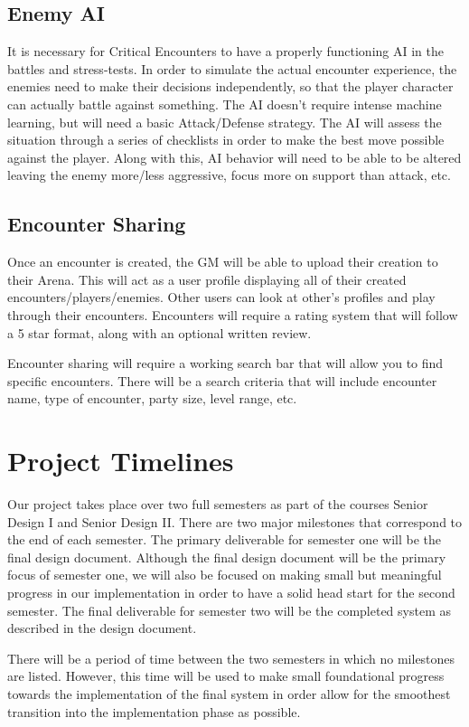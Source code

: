 \documentclass[12pt,a4paper]{report}
\begin{document}
		\subsection{Enemy AI}
		It is necessary for Critical Encounters to have a properly functioning AI in the battles and stress-tests. In order to simulate the actual encounter experience, the enemies need to make their decisions independently, so that the player character can actually battle against something. The AI doesn't require intense machine learning, but will need a basic Attack/Defense strategy. The AI will assess the situation through a series of checklists in order to make the best move possible against the player. Along with this, AI behavior will need to be able to be altered leaving the enemy more/less aggressive, focus more on support than attack, etc.
		\subsection{Encounter Sharing}
		Once an encounter is created, the GM will be able to upload their creation to their Arena. This will act as a user profile displaying all of their created encounters/players/enemies. Other users can look at other's profiles and play through their encounters. Encounters will require a rating system that will follow a 5 star format, along with an optional written review.
		
		Encounter sharing will require a working search bar that will allow you to find specific encounters. There will be a search criteria that will include encounter name, type of encounter, party size, level range, etc.
	\section{Project Timelines}
	Our project takes place over two full semesters as part of the courses Senior Design I and Senior Design II. There are two major milestones that correspond to the end of each semester. The primary deliverable for semester one will be the final design document. Although the final design document will be the primary focus of semester one, we will also be focused on making small but meaningful progress in our implementation in order to have a solid head start for the second semester. The final deliverable for semester two will be the completed system as described in the design document. 
	
	There will be a period of time between the two semesters in which no milestones are listed. However, this time will be used to make small foundational progress towards the implementation of the final system in order allow for the smoothest transition into the implementation phase as possible. 
	
\end{document}
